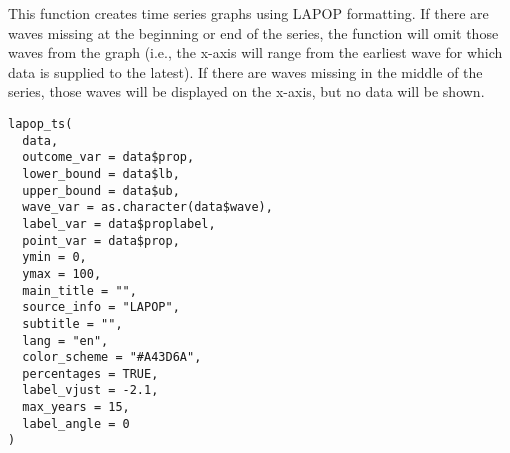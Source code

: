 \documentclass[a4paper]{book}
\begin{document}
%
\begin{Description}
This function creates time series graphs using LAPOP formatting.  If there are waves missing at the
beginning or end of the series, the function will omit those waves from the graph (i.e.,
the x-axis will range from the earliest wave for which data is supplied to the latest).  If there are
waves missing in the middle of the series, those waves will be displayed on the x-axis, but no data will be
shown.
\end{Description}
%
\begin{Usage}
\begin{verbatim}
lapop_ts(
  data,
  outcome_var = data$prop,
  lower_bound = data$lb,
  upper_bound = data$ub,
  wave_var = as.character(data$wave),
  label_var = data$proplabel,
  point_var = data$prop,
  ymin = 0,
  ymax = 100,
  main_title = "",
  source_info = "LAPOP",
  subtitle = "",
  lang = "en",
  color_scheme = "#A43D6A",
  percentages = TRUE,
  label_vjust = -2.1,
  max_years = 15,
  label_angle = 0
)
\end{verbatim}
\end{Usage}
%
\end{document}
